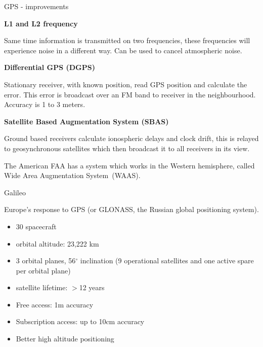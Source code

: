 \documentclass[compress]{beamer}
\begin{document}
\begin{frame}{GPS - improvements}

    {\bf L1 and L2 frequency}

    Same time information is transmitted on two frequencies, these
    frequencies will experience noise in a different way. Can be used to
    cancel atmospheric noise.

    \pause

    {\bf Differential GPS (DGPS)}

    Stationary receiver, with known position, read GPS position and
    calculate the error. This error is broadcast over an FM band to
    receiver in the neighbourhood. Accuracy is 1 to 3 meters.

    \pause

    {\bf Satellite Based Augmentation System (SBAS)}

    Ground based receivers calculate ionospheric delays and clock drift,
    this is relayed to geosynchronous satellites which then broadcast it
    to all receivers in its view.

    The American FAA has a system which works
    in the Western hemisphere, called Wide Area Augmentation
    System~(WAAS).

\end{frame}

\begin{frame}{Galileo}

    Europe's response to GPS (or GLONASS, the Russian global positioning
    system).

    \begin{itemize}

        \item 30 spacecraft
        \item orbital altitude: 23,222 km
        \item 3 orbital planes, 56$^{\circ}$ inclination (9 operational satellites and one
              active spare per orbital plane)
        \item satellite lifetime: $>$12 years
    \end{itemize}

    \pause

    \begin{itemize}

        \item Free access: 1m accuracy
        \item Subscription access: up to 10cm accuracy
        \item Better high altitude positioning
    \end{itemize}

\end{frame}
\end{document}
